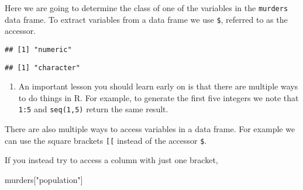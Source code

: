 \documentclass[]{article}
\newenvironment{Shaded}{\begin{snugshade}}{\end{snugshade}}
\newcommand{\CommentTok}[1]{\textcolor[rgb]{0.56,0.35,0.01}{\textit{#1}}}
\newcommand{\KeywordTok}[1]{\textcolor[rgb]{0.13,0.29,0.53}{\textbf{#1}}}
\newcommand{\NormalTok}[1]{#1}
\newcommand{\OperatorTok}[1]{\textcolor[rgb]{0.81,0.36,0.00}{\textbf{#1}}}
\newcommand{\StringTok}[1]{\textcolor[rgb]{0.31,0.60,0.02}{#1}}
\providecommand{\tightlist}{%
  \setlength{\itemsep}{0pt}\setlength{\parskip}{0pt}}
\begin{document}
Here we are going to determine the class of one of the variables in the
\texttt{murders} data frame. To extract variables from a data frame we
use \texttt{\$}, referred to as the accessor.

\begin{Shaded}
\end{Shaded}

\begin{verbatim}
## [1] "numeric"
\end{verbatim}

\begin{Shaded}
\end{Shaded}

\begin{verbatim}
## [1] "character"
\end{verbatim}

\begin{enumerate}
\def\labelenumi{\arabic{enumi}.}
\setcounter{enumi}{3}
\tightlist
\item
  An important lesson you should learn early on is that there are
  multiple ways to do things in R. For example, to generate the first
  five integers we note that \texttt{1:5} and \texttt{seq(1,5)} return
  the same result.
\end{enumerate}

There are also multiple ways to access variables in a data frame. For
example we can use the square brackets \texttt{{[}{[}} instead of the
accessor \texttt{\$}.

If you instead try to access a column with just one bracket,

\begin{Shaded}
\begin{Highlighting}[]
\NormalTok{murders[}\StringTok{"population"}\NormalTok{]}
\end{Highlighting}
\end{Shaded}
\end{document}
